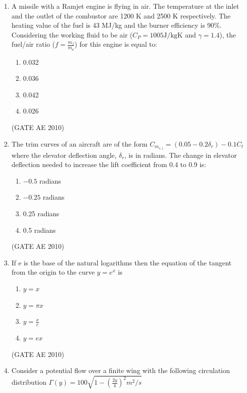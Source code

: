 \documentclass[journal]{IEEEtran}
\begin{document}
\begin{enumerate}
\item A missile with a Ramjet engine is flying in air. The temperature at the inlet and the outlet of the combustor are 1200 K and 2500 K respectively. The heating value of the fuel is 43 MJ/kg and the burner efficiency is 90\%. Considering the working fluid to be air ($ C_P = 1005  \text{J/kgK} $ and $ \gamma = 1.4 $), the fuel/air ratio ($ f = \frac{m_f}{m_a} $) for this engine is equal to:
\begin{multicols}{4}
\begin{enumerate}
\item 0.032
\item 0.036
\item 0.042
\item 0.026
\end{enumerate}
\end{multicols}
\hfill (GATE AE 2010)

\item The trim curves of an aircraft are of the form $ C_{m_{v,i}} = (0.05 - 0.2 \delta_r) - 0.1C_t $ where the elevator deflection angle, $\delta_r$, is in radians. The change in elevator deflection needed to increase the lift coefficient from 0.4 to 0.9 is:
\begin{multicols}{4}
\begin{enumerate}
\item $-0.5$ radians
\item $-0.25$ radians
\item 0.25 radians
\item 0.5 radians
\end{enumerate}
\end{multicols}
\hfill (GATE AE 2010)

\item If e is the base of the natural logarithms then the equation of the tangent from the origin to the curve $ y = e^x $ is
\begin{multicols}{4}
\begin{enumerate}
\item $ y = x $
\item $ y = \pi x $
\item $ y = \frac{x}{e} $
\item $ y = ex $
\end{enumerate}
\end{multicols}
\hfill (GATE AE 2010)

\item Consider a potential flow over a finite wing with the following circulation distribution
    $\Gamma(y) = 100 \sqrt{1 - \left( \frac{2y}{4} \right)^2 m^2 / s}$ 
    

\end{enumerate}
\end{document}
